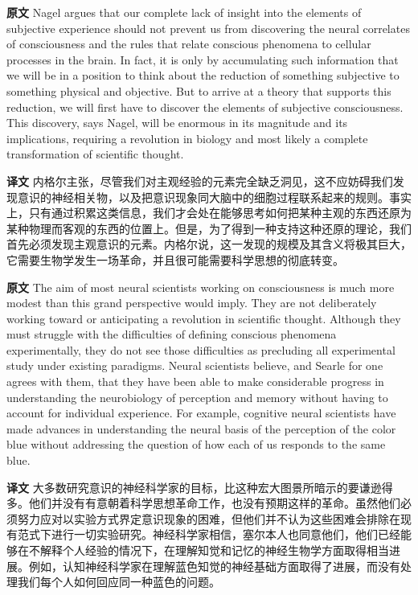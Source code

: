 \documentclass[UTF8]{ctexart}
\newenvironment{english}{\par\small\noindent\textbf{原文}\quad\ignorespaces}{\par}
\newenvironment{zhtranslation}{\par\noindent\textbf{译文}\quad\ignorespaces}{\par\vspace{0.35em}}
\begin{document}
\begin{english}
Nagel argues that our complete lack of insight into the elements of subjective experience should not prevent us from discovering the neural correlates of consciousness and the rules that relate conscious phenomena to cellular processes in the brain. In fact, it is only by accumulating such information that we will be in a position to think about the reduction of something subjective to something physical and objective. But to arrive at a theory that supports this reduction, we will first have to discover the elements of subjective consciousness. This discovery, says Nagel, will be enormous in its magnitude and its implications, requiring a revolution in biology and most likely a complete transformation of scientific thought.
\end{english}
\begin{zhtranslation}
内格尔主张，尽管我们对主观经验的元素完全缺乏洞见，这不应妨碍我们发现意识的神经相关物，以及把意识现象同大脑中的细胞过程联系起来的规则。事实上，只有通过积累这类信息，我们才会处在能够思考如何把某种主观的东西还原为某种物理而客观的东西的位置上。但是，为了得到一种支持这种还原的理论，我们首先必须发现主观意识的元素。内格尔说，这一发现的规模及其含义将极其巨大，它需要生物学发生一场革命，并且很可能需要科学思想的彻底转变。\end{zhtranslation}

\begin{english}
The aim of most neural scientists working on consciousness is much more modest than this grand perspective would imply. They are not deliberately working toward or anticipating a revolution in scientific thought. Although they must struggle with the difficulties of defining conscious phenomena experimentally, they do not see those difficulties as precluding all experimental study under existing paradigms. Neural scientists believe, and Searle for one agrees with them, that they have been able to make considerable progress in understanding the neurobiology of perception and memory without having to account for individual experience. For example, cognitive neural scientists have made advances in understanding the neural basis of the perception of the color blue without addressing the question of how each of us responds to the same blue.
\end{english}
\begin{zhtranslation}
大多数研究意识的神经科学家的目标，比这种宏大图景所暗示的要谦逊得多。他们并没有有意朝着科学思想革命工作，也没有预期这样的革命。虽然他们必须努力应对以实验方式界定意识现象的困难，但他们并不认为这些困难会排除在现有范式下进行一切实验研究。神经科学家相信，塞尔本人也同意他们，他们已经能够在不解释个人经验的情况下，在理解知觉和记忆的神经生物学方面取得相当进展。例如，认知神经科学家在理解蓝色知觉的神经基础方面取得了进展，而没有处理我们每个人如何回应同一种蓝色的问题。\end{zhtranslation}
\end{document}
